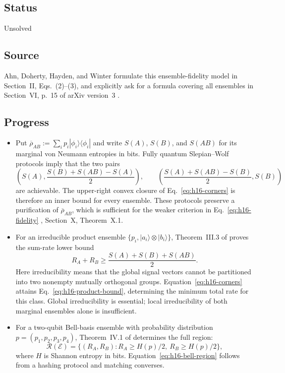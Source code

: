 \subsection*{Status}

Unsolved

\subsection*{Source}

Ahn, Doherty, Hayden, and Winter formulate this ensemble-fidelity model in Section~II, Eqs.~(2)--(3), and explicitly ask for a formula covering all ensembles in Section~VI, p.~15 of arXiv version~3 .

\subsection*{Progress}

\begin{itemize}
  \item Put $\overline\rho_{AB}:=\sum_i p_i|\phi_i\rangle\langle\phi_i|$ and write $S(A)$, $S(B)$, and $S(AB)$ for its marginal von Neumann entropies in bits. Fully quantum Slepian--Wolf protocols imply that the two pairs
\begin{equation}
 \left(S(A),\frac{S(B)+S(AB)-S(A)}2\right),\qquad
 \left(\frac{S(A)+S(AB)-S(B)}2,S(B)\right)
 \label{eq:h16-corners}
\end{equation}
are achievable. The upper-right convex closure of Eq.~\eqref{eq:h16-corners} is therefore an inner bound for every ensemble. These protocols preserve a purification of $\overline\rho_{AB}$, which is sufficient for the weaker criterion in Eq.~\eqref{eq:h16-fidelity} , Section~X, Theorem~X.1.

  \item For an irreducible product ensemble $\{p_i,|a_i\rangle\otimes|b_i\rangle\}$, Theorem~III.3 of  proves the sum-rate lower bound
\begin{equation}
 R_A+R_B\ge\frac{S(A)+S(B)+S(AB)}2.
 \label{eq:h16-product-bound}
\end{equation}
Here irreducibility means that the global signal vectors cannot be partitioned into two nonempty mutually orthogonal groups. Equation~\eqref{eq:h16-corners} attains Eq.~\eqref{eq:h16-product-bound}, determining the minimum total rate for this class. Global irreducibility is essential; local irreducibility of both marginal ensembles alone is insufficient.

  \item For a two-qubit Bell-basis ensemble with probability distribution $p=(p_1,p_2,p_3,p_4)$, Theorem~IV.1 of  determines the full region:
\begin{equation}
 \mathcal R(\mathcal E)=\{(R_A,R_B):R_A\ge H(p)/2,\ R_B\ge H(p)/2\},
 \label{eq:h16-bell-region}
\end{equation}
where $H$ is Shannon entropy in bits. Equation~\eqref{eq:h16-bell-region} follows from a hashing protocol and matching converses.
\end{itemize}

